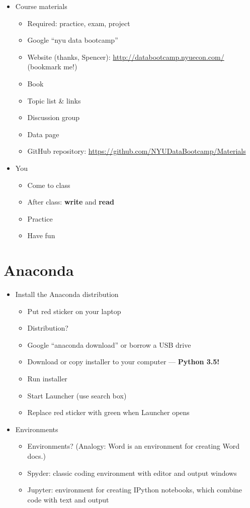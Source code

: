 \documentclass[11pt]{article}
\begin{document}
\begin{itemize}
\item Course materials
\begin{itemize}
\item Required:  practice, exam, project
\item Google ``nyu data bootcamp''
\item Website (thanks, Spencer):  \url{http://databootcamp.nyuecon.com/}  (bookmark me!)
\item Book
\item Topic list \& links
\item Discussion group
\item Data page
\item GitHub repository:  \url{https://github.com/NYUDataBootcamp/Materials}
\end{itemize}

\item You
\begin{itemize}
\item Come to class
\item After class:  {\bf write} and {\bf read}
\item Practice
\item Have fun
\end{itemize}
\end{itemize}


\section*{Anaconda}

\begin{itemize}
\item Install the Anaconda distribution
\begin{itemize}
\item Put red sticker on your laptop
\item Distribution?
\item Google ``anaconda download'' or borrow a USB drive
\item Download or copy installer to your computer --- {\bf Python 3.5!}
\item Run installer
\item Start Launcher (use search box)
\item Replace red sticker with green when Launcher opens
\end{itemize}

\item Environments
\begin{itemize}
\item Environments?  (Analogy:  Word is an environment for creating Word docs.)
\item Spyder:  classic coding environment with editor and output windows
\item Jupyter:  environment for creating IPython notebooks, which combine code with text and output
\end{itemize}

\end{itemize}
\end{document}
